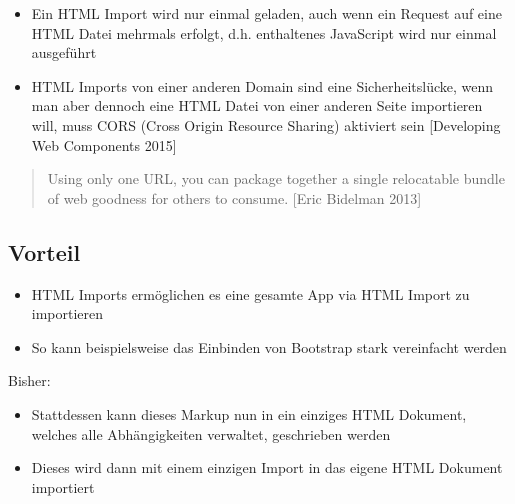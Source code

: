 \begin{itemize}
\tightlist
\item
  Ein HTML Import wird nur einmal geladen, auch wenn ein Request auf
  eine HTML Datei mehrmals erfolgt, d.h. enthaltenes JavaScript wird nur
  einmal ausgeführt
\item
  HTML Imports von einer anderen Domain sind eine Sicherheitslücke, wenn
  man aber dennoch eine HTML Datei von einer anderen Seite importieren
  will, muss CORS (Cross Origin Resource Sharing) aktiviert sein
  {[}Developing Web Components 2015{]}
\end{itemize}

\begin{quote}
Using only one URL, you can package together a single relocatable bundle
of web goodness for others to consume. {[}Eric Bidelman 2013{]}
\end{quote}

\subsection{Vorteil}\label{vorteil}

\begin{itemize}
\tightlist
\item
  HTML Imports ermöglichen es eine gesamte App via HTML Import zu
  importieren
\item
  So kann beispielsweise das Einbinden von Bootstrap stark vereinfacht
  werden
\end{itemize}

Bisher:

\begin{Shaded}
\begin{Highlighting}[]
\KeywordTok{>}
\KeywordTok{>}
\end{Highlighting}
\end{Shaded}

\begin{itemize}
\tightlist
\item
  Stattdessen kann dieses Markup nun in ein einziges HTML Dokument,
  welches alle Abhängigkeiten verwaltet, geschrieben werden
\item
  Dieses wird dann mit einem einzigen Import in das eigene HTML Dokument
  importiert
\end{itemize}

